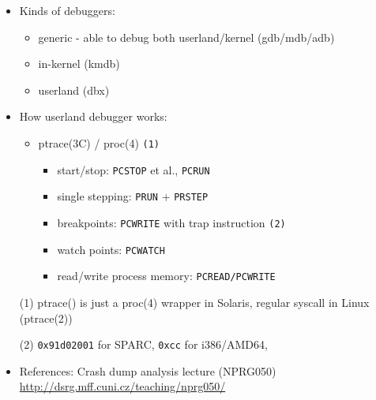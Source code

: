 \begin{itemize}
  \item Kinds of debuggers:
  \begin{itemize}
    \item generic - able to debug both userland/kernel (gdb/mdb/adb)
    \item in-kernel (kmdb)
    \item userland (dbx)
  \end{itemize}
  \item How userland debugger works:
  \begin{itemize}
     \item ptrace(3C) / proc(4) \texttt{(1)}
     \begin{itemize}
       \item start/stop: \texttt{PCSTOP} et al., \texttt{PCRUN}
       \item single stepping: \texttt{PRUN} + \texttt{PRSTEP}
       \item breakpoints: \texttt{PCWRITE} with trap instruction \texttt{(2)}
       \item watch points: \texttt{PCWATCH}
       \item read/write process memory: \texttt{PCREAD/PCWRITE}
     \end{itemize}
  \end{itemize}
\end{itemize}

\begin{itemize}
  \item[(1)] ptrace() is just a proc(4) wrapper in Solaris, regular
     syscall in Linux (ptrace(2))
  \item[(2)] \texttt{0x91d02001} for SPARC, \texttt{0xcc} for i386/AMD64,
  \item References: Crash dump analysis lecture (NPRG050)
     \url{http://dsrg.mff.cuni.cz/teaching/nprg050/}
\end{itemize}

